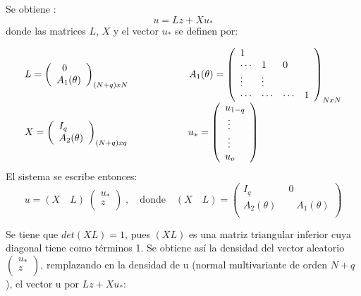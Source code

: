 Se obtiene :
\[
u = Lz + X u_{\ast} 
\]
donde las matrices $L$, $X$ y el vector $u_{\ast}$ se definen por:

\[
\begin{array}{l}
 L=\left( {\begin{array}{l}
 \;\;0 \\ 
 A_{1} (\theta ) \\ 
 \end{array}} \right)_{(N+q)xN} \quad \quad \quad \quad \quad \quad A_{1} 
(\theta )=\left( {{\begin{array}{*{20}c}
 1 \hfill & \hfill & \hfill & \hfill \\
 \cdots \hfill & 1 \hfill & 0 \hfill & \hfill \\
 \vdots \hfill & \vdots \hfill & \hfill & \hfill \\
 \cdots \hfill & \cdots \hfill & \cdots \hfill & 1 \hfill \\
\end{array} }} \right)_{NxN} \\ 
 X=\left( {\begin{array}{l}
 I_{q} \\ 
 A_{2} (\theta ) \\ 
 \end{array}} \right)_{(N+q)xq} \quad \quad \quad \quad \quad \quad u_{\ast 
} =\left( {\begin{array}{l}
 u_{1-q} \\ 
 \;\vdots \\ 
 \;\vdots \\ 
 u_{o} \\ 
 \end{array}} \right) \\ 
 \end{array}
\]
El sistema se escribe entonces:
\[
u=\left( {X\quad L} \right)\;\left( {\begin{array}{l}
 u_{\ast } \\ 
 z \\ 
 \end{array}} \right)\;,\quad \text{donde}\quad \left( {X\quad L} \right)=\left( 
{\begin{array}{l}
 I_{q\quad \quad \quad \quad } \quad 0 \\ 
 A_{2} (\theta )\quad \quad A_{1} (\theta ) \\ 
 \end{array}} \right)
\]

Se tiene que $det(XL)=1$, pues $(X L)$ es una matriz triangular inferior cuya diagonal tiene como t\'{e}rminos 1. Se obtiene as\'{i} la densidad del vector aleatorio $\left( {\begin{array}{l}
 u_{\ast } \\ 
 z \\ 
 \end{array}} \right)$, remplazando en la densidad de u (normal multivariante de orden $N+q$), el vector u por $Lz+Xu_{\ast}$:

